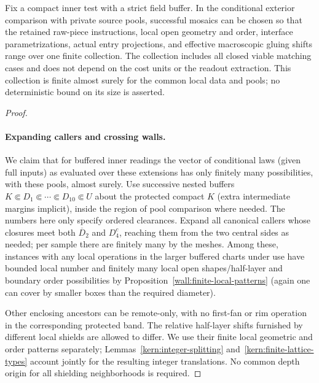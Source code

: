 \begin{proposition}\label{kern:matching-charts}
Fix a compact inner test with a strict field buffer. In the conditional exterior comparison with
private source pools, successful mosaics can be chosen so that the retained raw-piece instructions,
local open geometry and order, interface parametrizations, actual entry projections, and effective
macroscopic gluing shifts range over one finite collection. The collection includes all closed
viable matching cases and does not depend on the cost units or the readout extraction. This
collection is finite almost surely for the common local data and pools; no deterministic bound
on its size is asserted.
\end{proposition}
\begin{proof}\leavevmode

\paragraph{Expanding callers and crossing walls.}

We claim that for buffered inner readings the vector of conditional laws (given full inputs) as evaluated
over these extensions has only finitely many possibilities, with these pools, almost surely. Use successive
nested buffers \(K\Subset D_1\Subset \cdots \Subset D_{10}\Subset U\) about the protected compact \(K\)
(extra intermediate margins implicit), inside the region of pool comparison where needed. The numbers here
only specify ordered clearances. Expand all canonical callers whose closures meet both \(\overline D_2\) and
\(D_4^c\), reaching them from the two central sides as needed; per sample there are finitely many by the
meshes. Among these, instances with any local operations in the larger buffered charts under use have
bounded local number and finitely many local open shapes/half-layer and boundary order possibilities by Proposition~\ref{wall:finite-local-patterns} (again one can cover by smaller boxes than the required diameter).

Other
enclosing ancestors can be remote-only, with no first-fan or rim operation in the corresponding protected
band. The relative half-layer shifts furnished by different local shields are allowed to differ.
We use their finite local geometric and order patterns separately; Lemmas~\ref{kern:integer-splitting}
and~\ref{kern:finite-lattice-types} account jointly for the resulting integer translations.
No common depth origin for all shielding neighborhoods is required.


\end{proof}
